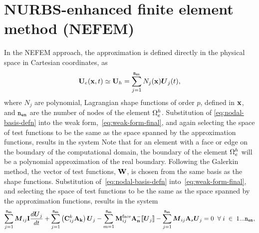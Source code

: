 



\section{NURBS-enhanced finite element method (NEFEM)}
In the NEFEM approach, the approximation is defined directly in the physical space in Cartesian coordinates, as
\begin{align}
\mathbf{U}_e(\mathbf{x},t) \simeq \mathbf{U}_h = \sum_{j=1}^{\texttt{n}_{\texttt{en}}} N_{j} (\mathbf{x}) \boldsymbol{U}_{j}(t) ,
\label{eq:nodal-basis-defn}
\end{align}
where $N_{j}$ are polynomial, Lagrangian shape functions of order $p$, defined in $\mathbf{x}$, and $\texttt{n}_{\texttt{en}}$ are the number of nodes of the element $\Omega_e^{h}$. Substitution of \eqref{eq:nodal-basis-defn} into the weak form,~\eqref{eq:weak-form-final}, and again selecting the space of test functions to be the same as the space spanned by the approximation functions, results in the system
Note that for an element with a face or edge on the boundary of the computational domain, the boundary of the element $\Omega_e^{h}$ will be a polynomial approximation of the real boundary\cite{}.
 Following the Galerkin method, the vector of test functions, $\mathbf{W}$, is chosen from the same basis as the shape
functions.
Substitution of~\eqref{eq:nodal-basis-defn} into~\eqref{eq:weak-form-final}, and selecting the space of test functions to be the same as the space spanned by the approximation functions, results in the system
\begin{equation}
\sum_{j=1}^{\texttt{n}_{\texttt{en}}} \boldsymbol{M}_{ij} \mathbf{I} \frac{d \boldsymbol{U}_j}{d t} + \sum_{j=1}^{\texttt{n}_{\texttt{en}}} \left( \mathbf{C}^{k}_{ij} \mathbf{A}_\mathbf{k} \right) \boldsymbol{U}_j - \sum_{m=1}^{\texttt{n}_{\texttt{en}}} \mathbf{M}^{\textrm{face}}_{ij} \mathbf{A}_\mathbf{n}^{-} \llbracket \boldsymbol{U}_j \rrbracket - \sum_{j=1}^{\texttt{n}_{\texttt{en}}} \boldsymbol{M}_{ij} \mathbf{A}_s \boldsymbol{U}_j = 0 \; \; \forall \; i \; \in \; 1...\texttt{n}_{\texttt{en}},
\label{eq:discretised-weak-form-nefem}
\end{equation}
